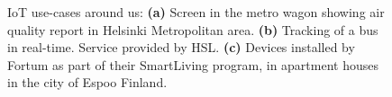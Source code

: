 \documentclass[english, 12pt, a4paper, elec, utf8, online]{aaltothesis}
\begin{document}
\begin{figure}[h!]
\centering
{}
\caption{IoT use-cases around us: \textbf{(a)} Screen in the metro wagon showing air quality report in Helsinki Metropolitan area. \textbf{(b)} Tracking of a bus in real-time. Service provided by HSL. \textbf{(c)} Devices installed by Fortum as part of their SmartLiving program, in apartment houses in the city of Espoo Finland.  }\label{fig:iot_in_our_lifes}
\end{figure}
\end{document}
